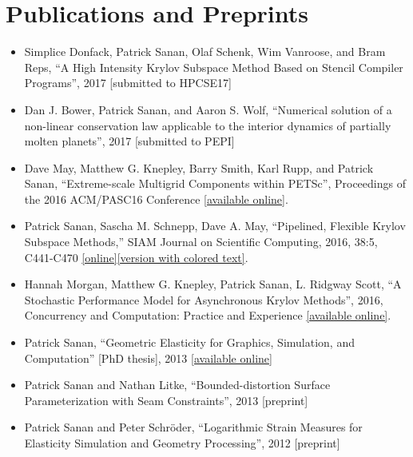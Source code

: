 \documentclass[12pt]{article}
\begin{document}
\section*{Publications and Preprints}
\begin{itemize}
\item Simplice Donfack, Patrick Sanan, Olaf Schenk, Wim Vanroose, and Bram Reps, ``A High Intensity Krylov Subspace Method Based on Stencil Compiler Programs'', 2017 [submitted to HPCSE17]
\item Dan J. Bower, Patrick Sanan, and Aaron S. Wolf, ``Numerical solution of a non-linear conservation law applicable to the interior dynamics of partially molten planets'', 2017 [submitted to PEPI]
\item Dave May, Matthew G. Knepley, Barry Smith, Karl Rupp, and Patrick Sanan, ``Extreme-scale Multigrid Components within PETSc'', Proceedings of the 2016 ACM/PASC16 Conference [\href{http://dl.acm.org/citation.cfm?doid=2929908.2929913}{available online}].
\item Patrick Sanan, Sascha M. Schnepp, Dave A. May, ``Pipelined, Flexible Krylov Subspace Methods,'' SIAM Journal on Scientific Computing, 2016, 38:5, C441-C470 \href{http://dx.doi.org/10.1137/15M1049130}{[online]}\href{http://arxiv.org/abs/1511.07226}{[version with colored text]}.
\item Hannah Morgan, Matthew G. Knepley, Patrick Sanan, L. Ridgway Scott, ``A Stochastic Performance Model for Asynchronous Krylov Methods'', 2016, Concurrency and Computation: Practice and Experience \href{http://onlinelibrary.wiley.com/doi/10.1002/cpe.3820/full}{[available online]}.
\item Patrick Sanan, ``Geometric Elasticity for Graphics, Simulation, and Computation'' [PhD thesis], 2013 \href{http://resolver.caltech.edu/CaltechTHESIS:12052013-121547860}{[available online]}
\item Patrick Sanan and Nathan Litke, ``Bounded-distortion Surface Parameterization with Seam Constraints'', 2013 [preprint]
\item Patrick Sanan and Peter Schr\"{o}der, ``Logarithmic Strain Measures for Elasticity Simulation and Geometry Processing'', 2012 [preprint]

\end{itemize}
\end{document}
